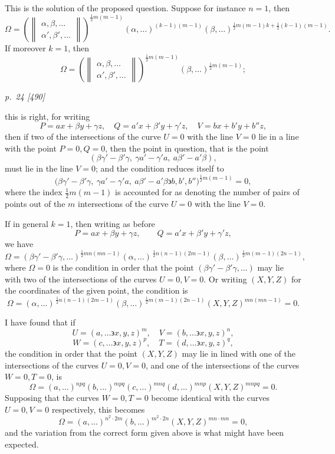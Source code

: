 ﻿\documentclass[11pt,a4paper]{article}
\theoremstyle{plain}
\theoremstyle{definition}
\newcommand{\eps}{\backepsilon}
\newcommand{\tworowcomb}[2]{%
  \left(\begin{Vmatrix}#1\\#2\end{Vmatrix}\right)}
\begin{document}
This is the solution of the proposed question. Suppose for instance \(n=1\),
then
\[
\Omega=
\tworowcomb{\alpha,\beta,\ldots}{\alpha',\beta',\ldots}^{\frac12 m(m-1)}
(\alpha,\ldots)^{(k-1)(m-1)}
(\beta,\ldots)^{\frac12 m(m-1)k+\frac12(k-1)(m-1)}.
\]
If moreover \(k=1\), then
\[
\Omega=
\tworowcomb{\alpha,\beta,\ldots}{\alpha',\beta',\ldots}^{\frac12 m(m-1)}
(\beta,\ldots)^{\frac12 m(m-1)};
\]

\clearpage
\textit{p.~24 [490]}

this is right, for writing
\[
P=ax+\beta y+\gamma z,\quad
Q=a'x+\beta' y+\gamma' z,\quad
V=bx+b'y+b''z,
\]
then if two of the intersections of the curve \(U=0\) with the line
\(V=0\) lie in a line with the point \(P=0,Q=0\), then the point in
question, that is the point
\[
(\beta\gamma'-\beta'\gamma,\ \gamma a'-\gamma'a,\ a\beta'-a'\beta),
\]
must lie in the line \(V=0\); and the condition reduces itself to
\[
\bigl(\beta\gamma'-\beta'\gamma,\ \gamma a'-\gamma'a,\ 
a\beta'-a'\beta \eps b,b',b''\bigr)^{\frac12 m(m-1)}=0,
\]
where the index \(\frac12 m(m-1)\) is accounted for as denoting the number
of pairs of points out of the \(m\) intersections of the curve \(U=0\) with
the line \(V=0\).

If in general \(k=1\), then writing as before
\[
P=ax+\beta y+\gamma z,\qquad Q=a'x+\beta' y+\gamma' z,
\]
we have
\[
\Omega=
(\beta\gamma'-\beta'\gamma,\ldots)^{\frac12 mn(mn-1)}
(\alpha,\ldots)^{\,\frac12 n(n-1)(2m-1)}
(\beta,\ldots)^{\,\frac12 m(m-1)(2n-1)},
\]
where \(\Omega=0\) is the condition in order that the point
\((\beta\gamma'-\beta'\gamma,\ldots)\) may lie with two of the
intersections of the curves \(U=0,V=0\). Or writing \((X,Y,Z)\) for the
coordinates of the given point, the condition is
\[
\Omega=(\alpha,\ldots)^{\,\frac12 n(n-1)(2m-1)}
(\beta,\ldots)^{\,\frac12 m(m-1)(2n-1)}
(X,Y,Z)^{mn(mn-1)}=0.
\]

I have found that if
\[
U=(a,\ldots\eps x,y,z)^m,\quad
V=(b,\ldots\eps x,y,z)^n,
\]
\[
W=(c,\ldots\eps x,y,z)^p,\quad
T=(d,\ldots\eps x,y,z)^q,
\]
the condition in order that the point \((X,Y,Z)\) may lie in lined with one
of the intersections of the curves \(U=0,V=0\), and one of the intersections
of the curves \(W=0,T=0\), is
\[
\Omega=(a,\ldots)^{npq}(b,\ldots)^{mpq}
(c,\ldots)^{mnq}(d,\ldots)^{mnp}(X,Y,Z)^{mnpq}=0.
\]
Supposing that the curves \(W=0,T=0\) become identical with the curves
\(U=0,V=0\) respectively, this becomes
\[
\Omega=(a,\ldots)^{n^2\cdot 2m}(b,\ldots)^{m^2\cdot 2n}
(X,Y,Z)^{mn\cdot mn}=0,
\]
and the variation from the correct form given above is what might have
been expected.
\end{document}
